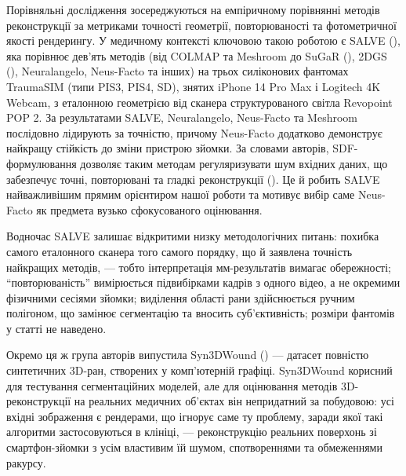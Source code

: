 \documentclass[
  ukrainian,
  10pt,
  a4paper,
  twocolumn]{article}
\begin{document}
Порівняльні дослідження зосереджуються на емпіричному порівнянні методів
реконструкції за метриками точності геометрії, повторюваності та
фотометричної якості рендерингу. У медичному контексті ключовою такою
роботою є SALVE (), яка порівнює дев'ять методів (від COLMAP та Meshroom до
SuGaR (), 2DGS
(), Neuralangelo,
Neus-Facto та інших) на трьох силіконових фантомах TraumaSIM (типи PIS3,
PIS4, SD), знятих iPhone 14 Pro Max і Logitech 4K Webcam, з еталонною
геометрією від сканера структурованого світла Revopoint POP 2. За
результатами SALVE, Neuralangelo, Neus-Facto та Meshroom послідовно
лідирують за точністю, причому Neus-Facto додатково демонструє найкращу
стійкість до зміни пристрою зйомки. За словами авторів, SDF-формулювання
дозволяє таким методам регуляризувати шум вхідних даних, що забезпечує
точні, повторювані та гладкі реконструкції
(). Це
й робить SALVE найважливішим прямим орієнтиром нашої роботи та мотивує
вибір саме Neus-Facto як предмета вузько сфокусованого оцінювання.

Водночас SALVE залишає відкритими низку методологічних питань: похибка
самого еталонного сканера того самого порядку, що й заявлена точність
найкращих методів, --- тобто інтерпретація мм-результатів вимагає
обережності; ``повторюваність'' вимірюється підвибірками кадрів з одного
відео, а не окремими фізичними сесіями зйомки; виділення області рани
здійснюється ручним полігоном, що замінює сегментацію та вносить
суб'єктивність; розміри фантомів у статті не наведено.

Окремо ця ж група авторів випустила Syn3DWound
() --- датасет
повністю синтетичних 3D-ран, створених у комп'ютерній графіці.
Syn3DWound корисний для тестування сегментаційних моделей, але для
оцінювання методів 3D-реконструкції на реальних медичних об'єктах він
непридатний за побудовою: усі вхідні зображення є рендерами, що ігнорує
саме ту проблему, заради якої такі алгоритми застосовуються в клініці,
--- реконструкцію реальних поверхонь зі смартфон-зйомки з усім властивим
їй шумом, спотвореннями та обмеженнями ракурсу.
\end{document}
